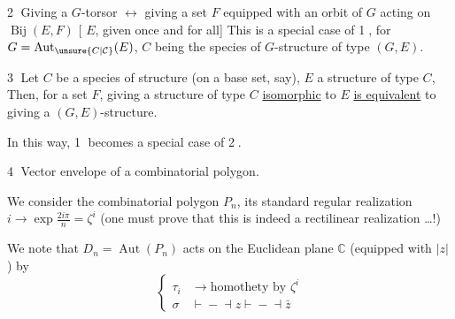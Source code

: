\textcircled{2} Giving a $G$-torsor  $\longleftrightarrow$ giving a set $F$ equipped with an orbit of $G$ acting on $\operatorname{Bij}(E,F)$
[ $E$,   given once and for all] This is a special case of \textcircled{1}, for $G=\operatorname{Aut}_{\unsure{C|\mathcal C}}(E)$, $C$ being the species of $G$-structure of type $(G,E)$.

\textcircled{3} Let $C$ be a species of structure (on a base set, say), $E$ a structure of type $C$,  Then, for a set $F$, giving a structure of type $C$ \uline{isomorphic} to $E$ \uline{is equivalent} to giving a $(G,E)$-structure.

In this way, \textcircled{1} becomes a special case of \textcircled{2}.

\textcircled{4} Vector envelope of a combinatorial polygon.

We consider the   combinatorial polygon \deleted{$\unsure{[1,n]|[1,n[}$\unsure{,}} $P_n$, its standard regular  realization $i\longrightarrow\exp\frac{2i\pi}{n}=\zeta^i$ (one must prove that this is indeed a rectilinear realization \ldots !)

We note that $D_n=\operatorname{Aut}(P_n)$ acts on  the Euclidean plane  $\mathbb{C}$ (equipped with $|z|$) by 
\[
\left\{\begin{aligned}
\tau_i &\longrightarrow \text{homothety by }\zeta^i\\
\sigma &\mathrel{\vdash\!\!-\!\dashv} z\mathrel{\vdash\!\!-\!\dashv}\bar z
\end{aligned}\right.
\]
